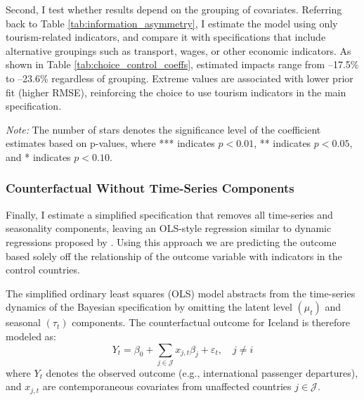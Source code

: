 \documentclass[12pt]{article}
\begin{document}
Second, I test whether results depend on the grouping of covariates. Referring back to Table \ref{tab:information_asymmetry}, I estimate the model using only tourism-related indicators, and compare it with specifications that include alternative groupings such as transport, wages, or other economic indicators. As shown in Table \ref{tab:choice_control_coeffs}, estimated impacts range from –17.5\% to –23.6\% regardless of grouping. Extreme values are associated with lower prior fit (higher RMSE), reinforcing the choice to use tourism indicators in the main specification.  



\begin{table}
\caption{Projected Change in Tourism From Different Coefficient Groups}
\label{tab:choice_control_coeffs}
\centering
\resizebox{\textwidth}{!}{}
  \begin{tablenotes}
    \footnotesize
    \item \textit{Note:} The number of stars denotes the significance level of the coefficient estimates based on p-values, where *** indicates $p<0.01$, ** indicates $p<0.05$, and * indicates $p<0.10$.
  \end{tablenotes}
\end{table}




\subsubsection{Counterfactual Without Time-Series Components}\label{sec:robustnes3}

Finally, I estimate a simplified specification that removes all time-series and seasonality components, leaving an OLS-style regression similar to dynamic regressions proposed by \citet{banerjee_2007_modeling}. Using this approach we are predicting the outcome based solely off the relationship of the outcome variable with indicators in the control countries. 

The simplified ordinary least squares (OLS) model abstracts from the time-series dynamics of the Bayesian specification by omitting the latent level $(\mu_t)$ and seasonal $(\tau_t)$ components. The counterfactual outcome for Iceland is therefore modeled as:
\[
Y_t = \beta_0 + \sum_{j \in \mathcal{J}} x_{j,t}\beta_j + \varepsilon_t, \quad j \neq i
\]
where $Y_t$ denotes the observed outcome (e.g., international passenger departures), and $x_{j,t}$ are contemporaneous covariates from unaffected countries $j \in \mathcal{J}$.
\end{document}

